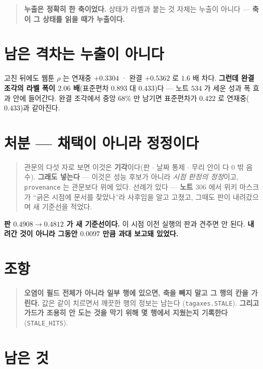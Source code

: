 \documentclass[11pt]{article}
\begin{document}
\begin{quote}
\textbf{누출은 정확히 한 축이었다.} 상태가 라벨과 붙는 것 자체는 누출이
아니다 --- \textbf{축이 그 상태를 읽을 때가 누출이다.}
\end{quote}

\section{남은 격차는 누출이 아니다}

고친 뒤에도 웹툰 $\rho$ 는 연재중 $+0.3304$ · 완결 $+0.5362$ 로 $1.6$ 배
차다. \textbf{그런데 완결 조각의 라벨 폭이 $2.06$ 배}(표준편차 $0.893$ 대
$0.433$)다 --- 노트 $534$ 가 세운 성과 폭 효과 안에 들어간다. 완결 조각에서
중앙 $68\%$ 만 남기면 표준편차가 $0.422$ 로 연재중($0.433$)과 같아진다.

\section*{처분 --- 채택이 아니라 정정이다}

\begin{quote}
관문의 다섯 자로 보면 이것은 \textbf{기각}이다(판 $\cdot$ 날짜 통제 $\cdot$
무리 안이 다 $0$ 밖 음수). \textbf{그래도 넣는다} --- 이것은 성능 후보가
아니라 \emph{시점 판정의 정정}이고, \texttt{provenance} 는 관문보다
위에 있다. 선례가 있다 --- \textbf{노트 $306$} 에서 위키 마스크가 ``긁은
시점에 문서를 찾았나''라 사후임을 알고 고쳤고, 그때도 판이 내려갔으며 새
기준선을 적었다.
\end{quote}

\textbf{판 $0.4908 \to 0.4812$ 가 새 기준선이다.} 이 시점 이전 실행의 판과
견주면 안 된다. \textbf{내려간 것이 아니라 그동안 $0.0097$ 만큼 과대
보고돼 있었다.}

\section*{조항}

\begin{quote}
\textbf{오염이 필드 전체가 아니라 일부 행에 있으면, 축을 빼지 말고 그 행의
칸을 가린다.} 값은 같이 치르면서 깨끗한 행의 정보는 남는다
(\texttt{tagaxes.STALE}). \textbf{그리고 가드가 조용히 안 도는 것을 막기
위해 몇 행에서 지웠는지 기록한다}(\texttt{STALE\_HITS}).
\end{quote}

\section*{남은 것}
\end{document}
